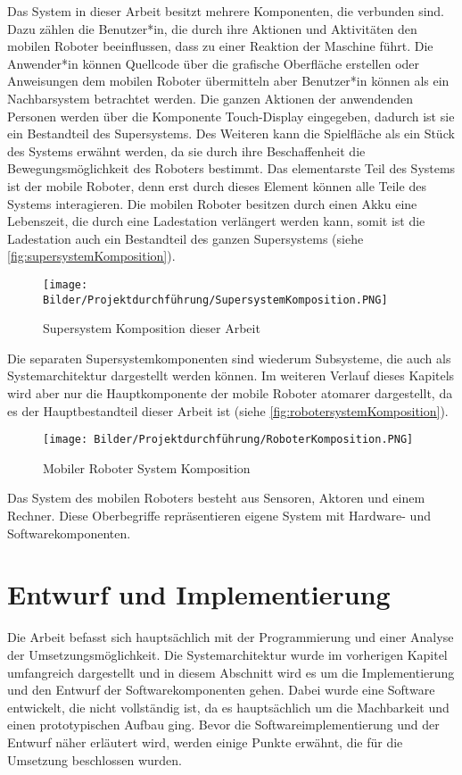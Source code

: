 Das System in dieser Arbeit besitzt mehrere Komponenten, die verbunden sind. Dazu zählen die Benutzer*in, die durch ihre Aktionen und Aktivitäten den mobilen Roboter beeinflussen, dass zu einer Reaktion der Maschine führt. Die Anwender*in können Quellcode über die grafische Oberfläche erstellen oder Anweisungen dem mobilen Roboter übermitteln aber Benutzer*in können als ein Nachbarsystem betrachtet werden. Die ganzen Aktionen der anwendenden Personen werden über die Komponente Touch-Display eingegeben, dadurch ist sie ein Bestandteil des Supersystems. Des Weiteren kann die Spielfläche als ein Stück des Systems erwähnt werden, da sie durch ihre Beschaffenheit die Bewegungsmöglichkeit des Roboters bestimmt. Das elementarste Teil des Systems ist der mobile Roboter, denn erst durch dieses Element können alle Teile des Systems interagieren. Die mobilen Roboter besitzen durch einen Akku eine Lebenszeit, die durch eine Ladestation verlängert werden kann, somit ist die Ladestation auch ein Bestandteil des ganzen Supersystems (siehe \autoref{fig:supersystemKomposition}). 

\begin{figure}[H]
 \centering
 \texttt{[image: Bilder/Projektdurchführung/SupersystemKomposition.PNG]}
 \caption{Supersystem Komposition dieser Arbeit}
 \label{fig:supersystemKomposition}
\end{figure}


Die separaten Supersystemkomponenten sind wiederum Subsysteme, die auch als Systemarchitektur dargestellt werden können. Im weiteren Verlauf dieses Kapitels wird aber nur die Hauptkomponente der mobile Roboter atomarer dargestellt, da es der Hauptbestandteil dieser Arbeit ist (siehe \autoref{fig:robotersystemKomposition}). 
\begin{figure}[H]
 \centering
 \texttt{[image: Bilder/Projektdurchführung/RoboterKomposition.PNG]}
 \caption{Mobiler Roboter System Komposition}
 \label{fig:robotersystemKomposition}
\end{figure}

Das System des mobilen Roboters besteht aus Sensoren, Aktoren und einem Rechner. Diese Oberbegriffe repräsentieren eigene System mit Hardware- und Softwarekomponenten.  


\section{Entwurf und Implementierung}
Die Arbeit befasst sich hauptsächlich mit der Programmierung und einer Analyse der Umsetzungsmöglichkeit. Die Systemarchitektur wurde im vorherigen Kapitel umfangreich dargestellt und in diesem Abschnitt wird es um die Implementierung und den Entwurf der Softwarekomponenten gehen. Dabei wurde eine Software entwickelt, die nicht vollständig ist, da es hauptsächlich um die Machbarkeit und einen prototypischen Aufbau ging. Bevor die Softwareimplementierung und der Entwurf näher erläutert wird, werden einige Punkte erwähnt, die für die Umsetzung beschlossen wurden.  

